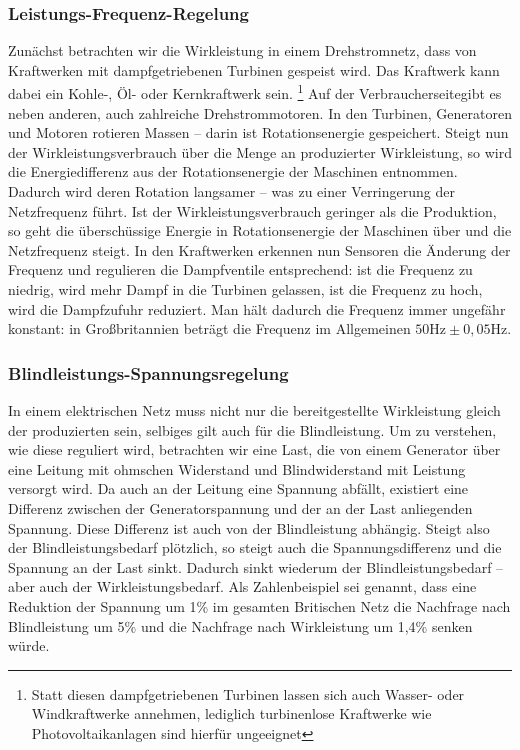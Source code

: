 \subsubsection{Leistungs-Frequenz-Regelung}
Zunächst betrachten wir die Wirkleistung in einem Drehstromnetz, dass von Kraftwerken mit dampfgetriebenen Turbinen gespeist wird. Das Kraftwerk kann dabei ein Kohle-, Öl- oder Kernkraftwerk sein. \footnote{Statt diesen dampfgetriebenen Turbinen lassen sich auch Wasser- oder Windkraftwerke annehmen, lediglich turbinenlose Kraftwerke wie Photovoltaikanlagen sind hierfür ungeeignet}
Auf der \q Verbraucherseite\qe gibt es neben anderen, auch zahlreiche Drehstrommotoren.
In den Turbinen, Generatoren und Motoren rotieren Massen – darin ist Rotationsenergie gespeichert.
Steigt nun der Wirkleistungsverbrauch über die Menge an produzierter Wirkleistung, so wird die Energiedifferenz aus der Rotationsenergie der Maschinen entnommen.\cite{Harrison}
Dadurch wird deren Rotation langsamer – was zu einer Verringerung der Netzfrequenz führt.
Ist der Wirkleistungsverbrauch geringer als die Produktion, so geht die überschüssige Energie in Rotationsenergie der Maschinen über und die Netzfrequenz steigt.
In den Kraftwerken erkennen nun Sensoren die Änderung der Frequenz und regulieren die Dampfventile entsprechend:
ist die Frequenz zu niedrig, wird mehr Dampf in die Turbinen gelassen, ist die Frequenz zu hoch, wird die Dampfzufuhr reduziert.
Man hält dadurch die Frequenz immer ungefähr konstant: in Großbritannien beträgt die Frequenz im Allgemeinen $50 \mathrm{Hz} \pm0,05 \mathrm{Hz}$.\cite{Harrison} %

\subsubsection{Blindleistungs-Spannungsregelung}
In einem elektrischen Netz muss nicht nur die bereitgestellte Wirkleistung gleich der produzierten sein, selbiges gilt auch für die Blindleistung.
Um zu verstehen, wie diese reguliert wird, betrachten wir eine Last, die von einem Generator über eine Leitung mit ohmschen Widerstand und Blindwiderstand mit Leistung versorgt wird. Da auch an der Leitung eine Spannung abfällt, existiert eine Differenz zwischen der Generatorspannung und der an der Last anliegenden Spannung. Diese Differenz ist auch von der Blindleistung abhängig. Steigt also der Blindleistungsbedarf plötzlich, so steigt auch die Spannungsdifferenz und die Spannung an der Last sinkt. Dadurch sinkt wiederum der Blindleistungsbedarf – aber auch der Wirkleistungsbedarf.
Als Zahlenbeispiel sei genannt, dass eine Reduktion der Spannung um 1\% im gesamten Britischen Netz die Nachfrage nach Blindleistung um 5\% und die Nachfrage nach Wirkleistung um 1,4\% senken würde.

